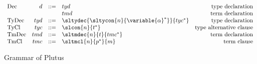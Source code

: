 \documentclass[../plutus-core-specification.tex]{subfiles}
\begin{document}
\begin{figure}[t]
\[\begin{array}{lrclr}
        \textrm{Dec}   & d   & ::= & tyd                          & \textrm{type declaration}\\
                       &     &     & tmd                          & \textrm{term declaration}\\
        \textrm{TyDec} & tyd & ::= & \sltydec{
                                        \sltycon{n}
                                         {\variable{\alpha}^*}
                                     }{tyc^*}                     & \textrm{type declaration}\\
        \textrm{TyCl}  & tyc & ::= & \slcon{n}{t^*}               & \textrm{type alternative clause}\\
        \textrm{TmDec} & tmd & ::= & \sltmdec{n}{t}{tmc^*}       & \textrm{term declaration}\\
        \textrm{TmCl}  & tmc & ::= & \sltmcl{n}{p^*}{m}           & \textrm{term clause}\\
    \end{array}\]
    \caption{Grammar of Plutus}
    \label{fig:Plutus_grammar}
\end{figure}
\end{document}
